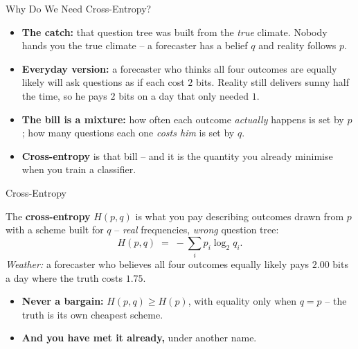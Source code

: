 \begin{frame}{Why Do We Need Cross-Entropy?}
\begin{itemize}
  \item \textbf{The catch:} that question tree was built from the \emph{true} climate. Nobody hands you the true climate -- a forecaster has a belief $q$ and reality follows $p$.
  \pause
  \item \textbf{Everyday version:} a forecaster who thinks all four outcomes are equally likely will ask questions as if each cost $2$ bits. Reality still delivers sunny half the time, so he pays $2$ bits on a day that only needed $1$.
  \pause
  \item \textbf{The bill is a mixture:} how often each outcome \emph{actually} happens is set by $p$; how many questions each one \emph{costs him} is set by $q$.
  \pause
  \item \textbf{Cross-entropy} is that bill -- and it is the quantity you already minimise when you train a classifier.
\end{itemize}
\end{frame}

\begin{frame}{Cross-Entropy}
\begin{rldefinition}
The \textbf{cross-entropy} $H(p, q)$ is what you pay describing outcomes drawn from $p$ with a scheme built for $q$ -- \emph{real} frequencies, \emph{wrong} question tree:
\[
H(p, q) \;=\; -\sum_i p_i \log_2 q_i .
\]
\emph{Weather:} a forecaster who believes all four outcomes equally likely pays $2.00$ bits a day where the truth costs $1.75$.
\end{rldefinition}
\pause
\begin{itemize}
  \item \textbf{Never a bargain:} $H(p,q) \ge H(p)$, with equality only when $q = p$ -- the truth is its own cheapest scheme.
  \pause
  \item \textbf{And you have met it already,} under another name.
\end{itemize}
\end{frame}


